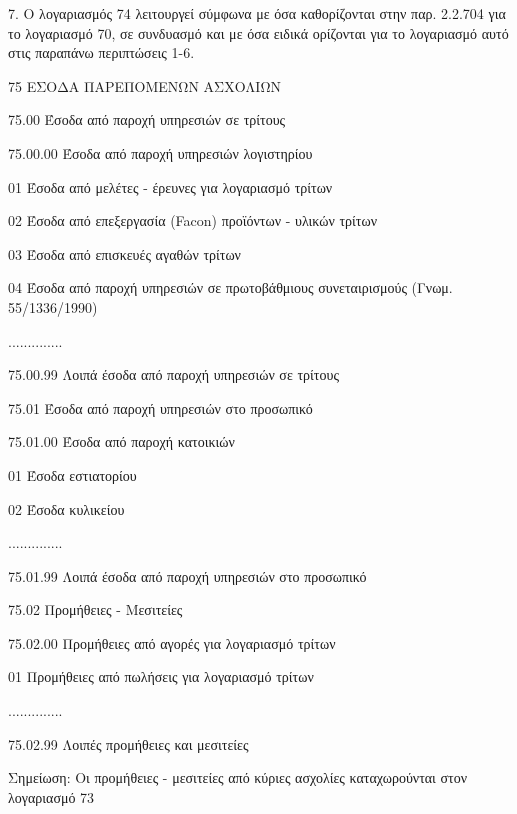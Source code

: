 \documentclass[A4,10pt,greek]{book}
\begin{document}
7. Ο λογαριασμός 74 λειτουργεί σύμφωνα με όσα καθορίζονται στην παρ. 2.2.704 για το λογαριασμό 70, σε συνδυασμό και με όσα ειδικά ορίζονται για το λογαριασμό αυτό στις παραπάνω περιπτώσεις 1-6.

 75    ΕΣΟΔΑ ΠΑΡΕΠΟΜΕΝΩΝ ΑΣΧΟΛΙΩΝ

         75.00    Έσοδα από παροχή υπηρεσιών σε τρίτους 

                      75.00.00    Έσοδα από παροχή υπηρεσιών λογιστηρίου 

                                01    Έσοδα από μελέτες - έρευνες για λογαριασμό τρίτων 

                                02    Έσοδα από επεξεργασία (Facon) προϊόντων - υλικών τρίτων 

                                03    Έσοδα από επισκευές αγαθών τρίτων 

                                04    Έσοδα από παροχή υπηρεσιών σε πρωτοβάθμιους
                                       συνεταιρισμούς (Γνωμ. 55/1336/1990)

                      ..............

                      75.00.99    Λοιπά έσοδα από παροχή υπηρεσιών σε τρίτους

         75.01    Έσοδα από παροχή υπηρεσιών στο προσωπικό 

                      75.01.00    Έσοδα από παροχή κατοικιών 

                                01    Έσοδα εστιατορίου 

                                02    Έσοδα κυλικείου 

                      ..............

                      75.01.99    Λοιπά έσοδα από παροχή υπηρεσιών στο προσωπικό

         75.02    Προμήθειες - Μεσιτείες 

                      75.02.00    Προμήθειες από αγορές για λογαριασμό τρίτων 

                                01    Προμήθειες από πωλήσεις για λογαριασμό τρίτων 

                      ..............

                      75.02.99    Λοιπές προμήθειες και μεσιτείες

                      Σημείωση:    Οι προμήθειες - μεσιτείες από κύριες ασχολίες καταχωρούνται
                                             στον λογαριασμό 73
\end{document}
